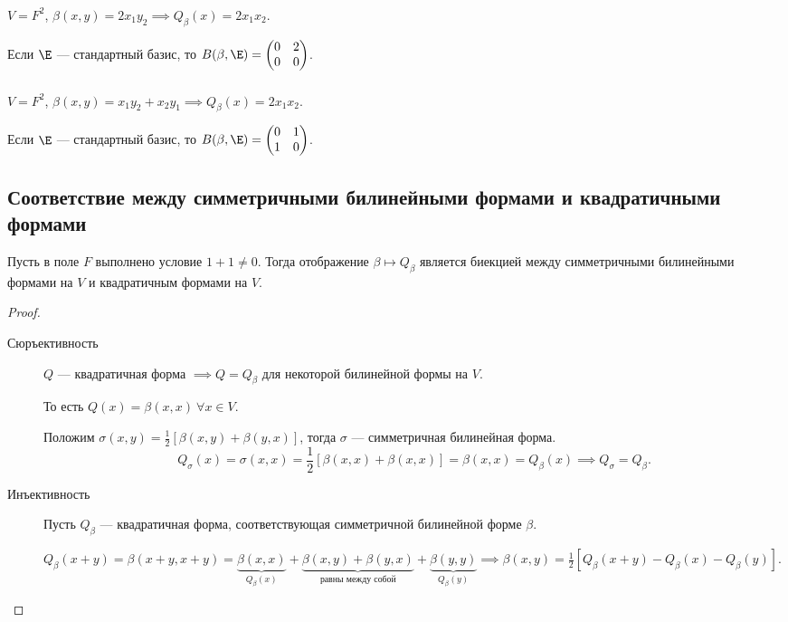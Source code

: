 \subsubsection{}

$V = F^2$, $\beta(x, y) = 2x_1 y_2 \implies Q_\beta(x) = 2x_1 x_2$.

Если $\E$ --- стандартный базис, то $B(\beta, \E) = \begin{pmatrix} 0 & 2 \\ 0 & 0 \end{pmatrix}$.

\subsubsection{}

$V = F^2$, $\beta(x, y) = x_1 y_2 + x_2 y_1 \implies Q_\beta(x) = 2x_1 x_2$.

Если $\E$ --- стандартный базис, то $B(\beta, \E) = \begin{pmatrix} 0 & 1 \\ 1 & 0 \end{pmatrix}$.


\subsection{Соответствие между симметричными билинейными формами и квадратичными формами}

\begin{proposal}
    Пусть в поле $F$ выполнено условие $1 + 1 \neq 0$. Тогда отображение $\beta \mapsto Q_\beta$ является биекцией между симметричными билинейными формами на $V$ и квадратичным формами на $V$.
\end{proposal}


\begin{proof}~
    \begin{description}
    \item[Сюръективность] $Q$ --- квадратичная форма $ \implies Q = Q_\beta$ для некоторой билинейной формы на $V$.

        То есть $Q(x) = \beta(x, x) \ \forall x \in V$.

        Положим $\sigma(x, y) = \frac{1}{2} \left[\beta(x, y) + \beta(y, x)\right]$, тогда $\sigma$ --- симметричная билинейная форма.
        \begin{equation*}
            Q_{\sigma} (x) =  \sigma(x, x) = \frac{1}{2}\left[\beta(x, x) + \beta(x, x)\right] = \beta(x, x) = Q_{\beta} (x) \implies Q_{\sigma} = Q_{\beta}
        .\end{equation*}

    \item[Инъективность] Пусть $Q_{\beta}$ --- квадратичная форма, соответствующая симметричной билинейной форме $\beta$.

        $Q_\beta(x + y) = \beta(x + y, x + y) = \underbrace{\beta(x, x)}_{Q_\beta(x)} + \underbrace{\beta(x, y) + \beta(y, x)}_{\text{равны между собой}} + \underbrace{\beta(y, y)}_{Q_\beta(y)} \implies \beta(x, y) = \frac{1}{2} \left[Q_\beta(x + y) - Q_\beta(x) - Q_\beta(y)\right]$.
    \end{description}
\end{proof}


